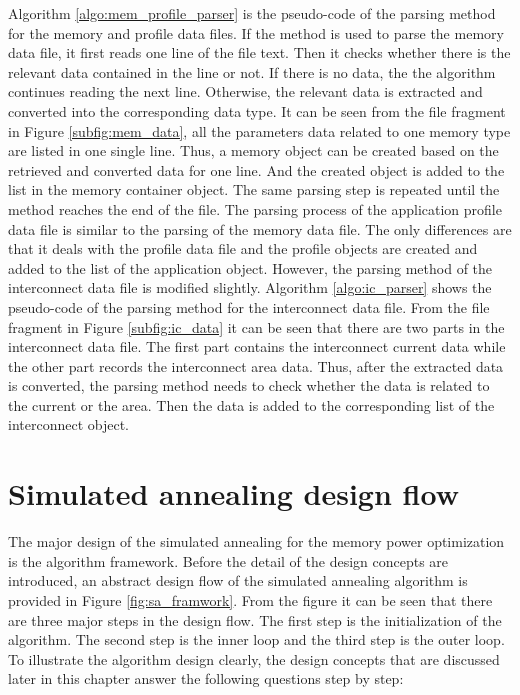 	
	
	Algorithm \ref{algo:mem_profile_parser} is the pseudo-code of
	the parsing method for the memory and profile data files. If the method is
	used to parse the memory data file, it first reads one line of the file text.
	Then it checks whether there is the relevant data contained in the line or not.
	If there is no data, the the algorithm continues reading the next line.
	Otherwise, the relevant data is extracted and converted into the corresponding
	data type.
	It can be seen from the file fragment in Figure \ref{subfig:mem_data}, all the
	parameters data related to one memory type are listed in one single line.
	Thus, a memory object can be created based on the retrieved and converted data
	for one line. And the created object is added to the list in the memory container
	object. The same parsing step is repeated until the method reaches the end of
	the file. The parsing process of the application profile data file is similar
	to the parsing of the memory data file.
	The only differences are that it deals with the profile data file and the
	profile objects are created and added to the list of the application object.
	However, the parsing method of the interconnect data file is modified slightly.
	Algorithm \ref{algo:ic_parser} shows the pseudo-code of the parsing method for
	the interconnect data file.
	From the file fragment in Figure \ref{subfig:ic_data} it can be seen that there
	are two parts in the interconnect data file.
	The first part contains the interconnect current data while the other part
	records the interconnect area data. Thus, after the extracted data is converted,
	the parsing method needs to check whether the data is related to the current or
	the area. Then the data is added to the corresponding list of the interconnect
	object.
	
	
	
	\section{Simulated annealing design flow}
	\label{sec:sa_design_flow}
	The major design of the simulated annealing for the memory power optimization is
	the algorithm framework. Before the detail of the design concepts are introduced,
	an abstract design flow of the simulated annealing algorithm is provided in Figure
	\ref{fig:sa_framwork}. From the figure it can be seen that there are three major
	steps in the design flow. The first step is the initialization of the algorithm.
	The second step is the inner loop and the third step is the outer loop.
	To illustrate the algorithm design clearly, the design concepts that are discussed
	later in this chapter answer the following questions step by step:
	
